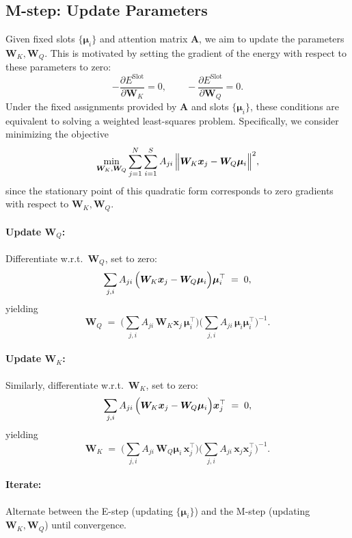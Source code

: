 \documentclass{article}
\begin{document}
    \subsection*{M-step: Update Parameters}
    
    Given fixed slots \(\{\bm{\mu}_i\}\) and attention matrix \(\mathbf{A}\), we aim to update the parameters \(\bm{W}_K,\bm{W}_Q\). This is motivated by setting the gradient of the energy with respect to these parameters to zero:
    \[
    -\frac{\partial E^{\mathrm{Slot}}}{\partial \bm{W}_K} = 0,
    \qquad
    -\frac{\partial E^{\mathrm{Slot}}}{\partial \bm{W}_Q} = 0.
    \]
    Under the fixed assignments provided by \(\mathbf{A}\) and slots \(\{\bm{\mu}_i\}\), these conditions are equivalent to solving a weighted least-squares problem. Specifically, we consider minimizing the objective
    \[
    \min_{\bm{W}_K,\bm{W}_Q}
    \sum_{j=1}^N\sum_{i=1}^S
    A_{ji}\,
    \Bigl\|\bm{W}_K\bm{x}_j - \bm{W}_Q\bm{\mu}_i\Bigr\|^2,
    \]
    since the stationary point of this quadratic form corresponds to zero gradients with respect to \(\bm{W}_K,\bm{W}_Q\).


    \paragraph{Update \(\bm{W}_Q\):}
    Differentiate w.r.t.\ \(\bm{W}_Q\), set to zero:
    \[
    \sum_{j,i}A_{ji}\,
    \Bigl(\bm{W}_K\bm{x}_j - \bm{W}_Q\bm{\mu}_i\Bigr)
    \bm{\mu}_i^\top
    \;=\;0,
    \]
    yielding
    \[
    \bm{W}_Q
    \;=\;
    \Biggl(
    \sum_{j,i}A_{ji}\,
    \bm{W}_K\bm{x}_j\,\bm{\mu}_i^\top
    \Biggr)
    \Biggl(\sum_{j,i}A_{ji}\,
    \bm{\mu}_i\bm{\mu}_i^\top
    \Biggr)^{-1}.
    \]
    \paragraph{Update \(\bm{W}_K\):}
    Similarly, differentiate w.r.t.\ \(\bm{W}_K\), set to zero:
    \[
    \sum_{j,i}A_{ji}\,
    \Bigl(\bm{W}_K\bm{x}_j - \bm{W}_Q\bm{\mu}_i\Bigr)
    \bm{x}_j^\top
    \;=\;0,
    \]
    yielding
    \[
    \bm{W}_K
    \;=\;
    \Biggl(
    \sum_{j,i}A_{ji}\,
    \bm{W}_Q\bm{\mu}_i\,\bm{x}_j^\top
    \Biggr)
    \Biggl(\sum_{j,i}A_{ji}\,
    \bm{x}_j\bm{x}_j^\top
    \Biggr)^{-1}.
    \]
    
    \paragraph{Iterate:}
    Alternate between the E-step (updating \(\{\bm{\mu}_i\}\)) and the M-step (updating \(\bm{W}_K,\bm{W}_Q\)) until convergence.
\end{document}
